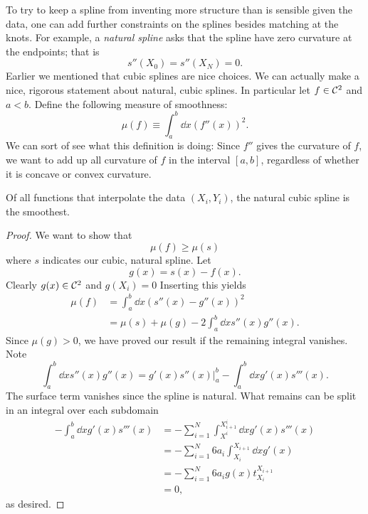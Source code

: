 To try to keep a spline from inventing more structure than is sensible given the
data, one can add further constraints on the splines besides matching at the
knots. For example, a {\it natural spline} asks that
the spline have zero curvature at the endpoints; that is
\begin{equation}
s''(X_0)=s''(X_N)=0.
\end{equation}
Earlier we mentioned that cubic splines are nice choices. We can actually make
a nice, rigorous statement about natural, cubic splines. In particular
let $f\in\mathcal{C}^2$ and $a<b$. Define the following measure of smoothness:
\begin{equation}
\mu(f)\equiv\int_a^b \dd{x}(f''(x))^2.
\end{equation}
We can sort of see what this definition is doing: Since $f''$ gives the
curvature of $f$, we want to add up all curvature of $f$ in the interval
$[a,b]$, regardless of whether it is concave or convex curvature.

\begin{theorem}{}{}
Of all functions that interpolate the data $(X_i,Y_i)$, the natural
cubic spline is the smoothest.
\begin{proof}
We want to show that
$$
\mu(f) \geq \mu(s)
$$
where $s$ indicates our cubic, natural spline.
Let
$$
 g(x)=s(x)-f(x).
$$
Clearly
$g(x) \in \mathcal{C}^2$
and $g\left(X_i\right)=0$
Inserting this yields
$$
\begin{aligned}
\mu(f) & =\int_a^b\dd{x}\left(s''(x)-g''(x)\right)^2 \\
& =\mu(s)+\mu(g)-2 \int_a^b\dd{x} s''(x) g''(x).
\end{aligned}
$$
Since $\mu(g)>0$, we have proved our result if the
remaining integral vanishes. Note 
$$
\int_a^b \dd{x}s''(x) g''(x)=\left.g'(x) s''(x)\right|_a^b
-\int_a^b \dd{x} g'(x) s'''(x).
$$
The surface term vanishes since the spline is natural.
What remains can be split in an integral over each subdomain
$$
\begin{aligned}
-\int_a^b \dd{x}g'(x) s'''(x) 
& =-\sum_{i=1}^{N} \int_{X^i}^{X_{i+1}^i}\dd{x} g'(x) s'''(x) \\
& =-\sum_{i=1}^{N} 6 a_i \int_{X_i}^{X_{i+1}}\dd{x} g'(x) \\
& =-\sum_{i=1}^{N} 6 a_i g(x) t_{X_i}^{X_{i+1}}\\
& =0,
\end{aligned}
$$
as desired.
\end{proof}
\end{theorem}

